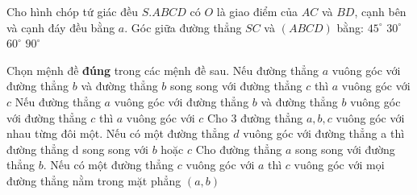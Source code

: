 \begin{ex}	%
 
Cho hình chóp tứ giác đều $  S.ABCD $ có $ O $ là giao điểm của $ AC $ và $ BD $, cạnh bên và cạnh đáy đều bằng $ a $. Góc giữa đường thẳng $ SC $ và $ (ABCD) $ bằng:
\choice 
{\True $45^\circ $}
{ $30^\circ $}
{$60^\circ $}
{$90^\circ $}
\end{ex}
\begin{ex}	 %
 
Chọn mệnh đề \textbf{đúng} trong các mệnh đề sau.
\choice
 {\True Nếu đường thẳng $ a $ vuông góc với đường thẳng $ b $ và đường thẳng $ b $ song song với đường thẳng $ c $ thì $ a $ vuông góc với $ c $}
{Nếu đường thẳng $ a $ vuông góc với đường thẳng $ b $ và đường thẳng $ b $ vuông góc với đường thẳng $ c $ thì $ a $ vuông góc với $ c $}
 {Cho $  3$ đường thẳng $ a, b, c $ vuông góc với nhau từng đôi một. Nếu có một đường thẳng $ d $ vuông góc với đường thẳng a thì đường thẳng d song song với $ b  $ hoặc $ c $}
 {Cho đường thẳng $ a $ song song với đường thẳng $ b $. Nếu có một đường thẳng $ c $ vuông góc với $ a $ thì $ c $ vuông góc với mọi đường thẳng nằm trong mặt phẳng $ (a,b) $}
\end{ex}
